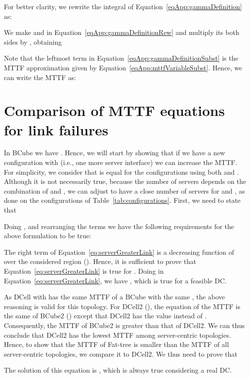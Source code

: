 For better clarity, we rewrite the integral of Equation~\ref{eqApp:gammaDefinition} as:

We make  and  in Equation~\ref{eqApp:gammaDefinitionRew} and multiply its both sides by , obtaining


Note that the leftmost term in Equation~\ref{eqApp:gammaDefinitionSubst} is the MTTF approximation given by Equation~\ref{eqApp:mttfVariableSubst}. 
Hence, we can write the MTTF as:


\section{Comparison of MTTF equations for link failures}
\label{app:compMTTFEquations}

In BCube we have . Hence, we will start by showing that if we have a new configuration with  (i.e., one more server interface) we can increase the MTTF. For simplicity, we consider that  is equal for the configurations using both  and . Although it is not necessarily true, because the number of servers depends on the combination of  and , we can adjust  to have a close number of servers for  and , as done on the configurations of Table~\ref{tab:configurations}.
First, we need to state that



Doing , and rearranging the terms we have the following requirements for the above formulation to be true:



The right term of Equation~\ref{eq:serverGreaterLink} is a decreasing function of  over the considered region (). Hence, it is sufficient to prove that Equation~\ref{eq:serverGreaterLink} is true for . Doing  in Equation~\ref{eq:serverGreaterLink}, we have , which is true for a feasible DC.

As DCell with  has the same MTTF of a BCube with the same , the above reasoning is valid for this topology. For DCell2 (), the equation of the MTTF is the same of BCube2 () except that DCell2 has the value  instead of . Consequently, the MTTF of BCube2 is greater than that of DCell2. We can thus conclude that DCell2 has the lowest MTTF among server-centric topologies. Hence, to show that the MTTF of Fat-tree is smaller than the MTTF of all server-centric topologies, we compare it to DCell2. We thus need to prove that



The solution of this equation is , which is always true considering a real DC.

